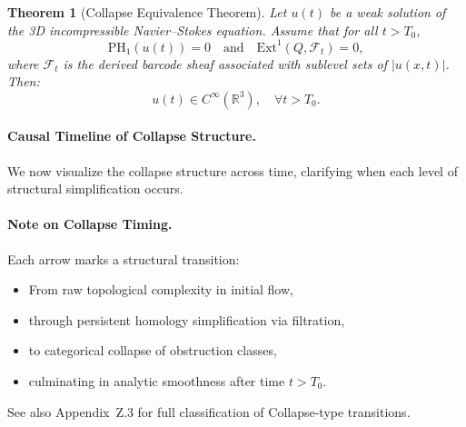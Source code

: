 \documentclass[11pt]{article}
\newtheorem{theorem}{Theorem}[section]
\begin{document}
\begin{theorem}[Collapse Equivalence Theorem]
Let \( u(t) \) be a weak solution of the 3D incompressible Navier–Stokes equation.  
Assume that for all \( t > T_0 \),
\[
\mathrm{PH}_1(u(t)) = 0 \quad \text{and} \quad \mathrm{Ext}^1(Q, \mathcal{F}_t) = 0,
\]
where \( \mathcal{F}_t \) is the derived barcode sheaf associated with sublevel sets of \( |u(x,t)| \).  
Then:
\[
u(t) \in C^\infty(\mathbb{R}^3), \quad \forall t > T_0.
\]
\end{theorem}

\paragraph{Causal Timeline of Collapse Structure.}
We now visualize the collapse structure across time, clarifying when each level of structural simplification occurs.

\begin{center}
\end{center}

\paragraph{Note on Collapse Timing.}
Each arrow marks a structural transition:
\begin{itemize}
  \item From raw topological complexity in initial flow,
  \item through persistent homology simplification via filtration,
  \item to categorical collapse of obstruction classes,
  \item culminating in analytic smoothness after time \( t > T_0 \).
\end{itemize}

See also Appendix~Z.3 for full classification of Collapse-type transitions.

\begin{center}

\vspace{0.5em}
\end{center}
\end{document}
